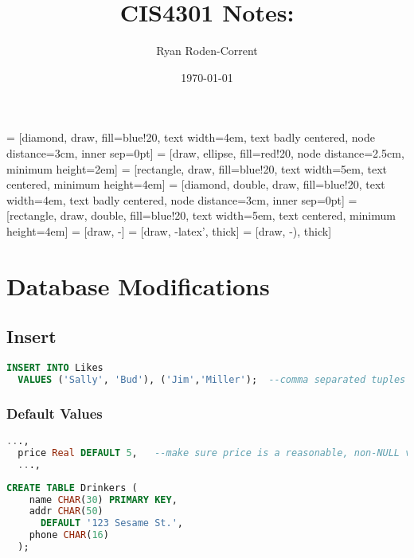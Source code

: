 \documentclass[12pt]{article}
\title{CIS4301 Notes: }
\author{Ryan Roden-Corrent}
\date{\today}
\begin{document}
\setlength\parindent{0pt}
 = [diamond, draw, fill=blue!20, text width=4em,
  text badly centered, node distance=3cm, inner sep=0pt]
 = [draw, ellipse, fill=red!20, node distance=2.5cm,
  minimum height=2em]
 = [rectangle, draw, fill=blue!20, text width=5em,
  text centered, minimum height=4em]
 = [diamond, double, draw, fill=blue!20, text width=4em,
  text badly centered, node distance=3cm, inner sep=0pt]
 = [rectangle, draw, double, fill=blue!20, text width=5em,
  text centered, minimum height=4em]
 = [draw, -]
 = [draw, -latex', thick]
 = [draw, -), thick]
\maketitle

\section{Database Modifications}
\subsection{Insert}
\begin{lstlisting}[language=sql,caption=multiple value insertion]
  INSERT INTO Likes
  VALUES ('Sally', 'Bud'), ('Jim','Miller');  --comma separated tuples to enter
\end{lstlisting}
\subsubsection{Default Values}
\begin{lstlisting}[language=sql,caption=price defaults to 5 if not specified]
  ...,
  price Real DEFAULT 5,   --make sure price is a reasonable, non-NULL value
  ...,
\end{lstlisting}
\begin{lstlisting}[language=sql,caption=another default example]
  CREATE TABLE Drinkers (
    name CHAR(30) PRIMARY KEY,
    addr CHAR(50)
      DEFAULT '123 Sesame St.',
    phone CHAR(16)
  );
\end{lstlisting}
\end{document}
